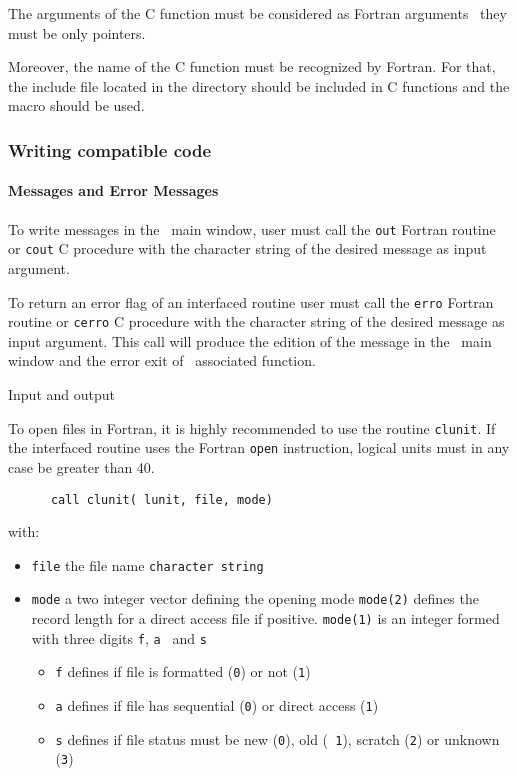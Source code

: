 The arguments of the C function must be considered as Fortran arguments \ie\
they must be only pointers.

Moreover, the name of the C function must be recognized by
Fortran. For that, the include file  located in the
directory \M{\SCI\ directory}\T{/routines} should be included in 
C functions and the macro \T{C2F} should be used.

\subsubsection{Writing compatible code}
\label{compat}

\paragraph{ Messages and Error Messages}

To write messages in the  \SCI\ main window, user  must call the
{\tt out} Fortran routine or {\tt cout} C procedure with the
character string of the desired message as input argument.

To return an error flag of  an interfaced routine user must call the
{\tt erro} Fortran routine or {\tt cerro} C procedure with the
character string of the desired message as input argument. This call
will produce the edition of the message in the \SCI\ main window and
the error exit of \SCI\ associated function.

{ Input and output}


To open files in Fortran, it is highly recommended to  use the 
\SCI routine {\tt   clunit}. If the interfaced routine uses the 
Fortran {\tt open}
instruction, logical units must in any case be greater than 40.
\begin{verbatim}
      call clunit( lunit, file, mode)
\end{verbatim}
with:
\begin{itemize}
\item {\tt file} the file name {\tt character string}
\item {\tt mode} a two integer vector defining the opening mode
 {\tt mode(2)} defines the record length for a direct access file if
 positive. 
{\tt mode(1)} is an integer formed with three digits {\tt f}, {\tt a }
and {\tt s}
\begin{itemize}
\item {\tt f} defines if file is formatted ({\tt 0}) or not ({\tt 1})
\item {\tt a} defines if file has sequential ({\tt 0}) or direct
  access ({\tt 1})
\item {\tt s} defines if file status must be new ({\tt 0}), old ({\tt
    1}), scratch ({\tt 2}) or unknown ({\tt 3})
\end{itemize}
\end{itemize}

